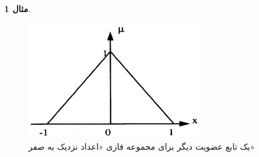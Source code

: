 \documentclass[12pt,a4paper]{article}
\theoremstyle{definition}
\newtheorem{exmp}{مثال}[section]
\begin{document}
\begin{exmp}
\cite{Wang1997}	
\begin{figure}[h]
	\centering 
	\includegraphics[width=75mm]{Images/Fig4.png}
	\vspace{-0.3cm}
	\caption{یک تابع عضویت دیگر برای مجموعه فازی «اعداد نزدیک به صفر»}\label{fig:f_4}
\end{figure}
\end{exmp}

\end{document}
